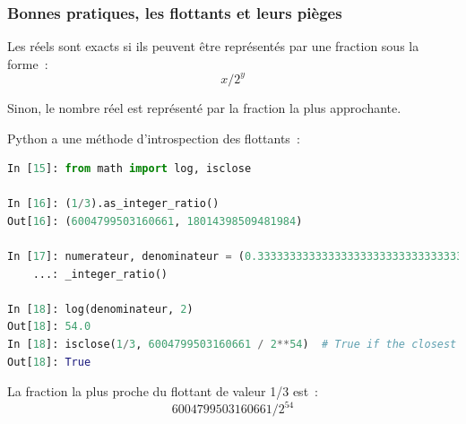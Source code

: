 \documentclass{beamer}
\begin{document}
    \begin{frame}[fragile]
        \transdissolve
        \frametitle{Bonnes pratiques, les flottants et leurs pièges}

        Les réels sont exacts si ils peuvent être représentés par une fraction sous la forme~:\[ x / 2^y \]

        Sinon, le nombre réel est représenté par la fraction la plus approchante.

        Python a une méthode d'introspection des flottants~:

        \begin{lstlisting}[language=python]
In [15]: from math import log, isclose

In [16]: (1/3).as_integer_ratio()
Out[16]: (6004799503160661, 18014398509481984)

In [17]: numerateur, denominateur = (0.3333333333333333333333333333333333333).as
    ...: _integer_ratio()

In [18]: log(denominateur, 2)
Out[18]: 54.0
In [18]: isclose(1/3, 6004799503160661 / 2**54)  # True if the closest fraction
Out[18]: True
        \end{lstlisting}

        La fraction la plus proche du flottant de valeur 1/3 est~:\[ 6004799503160661 / 2^{54} \]

    \end{frame}
\end{document}
